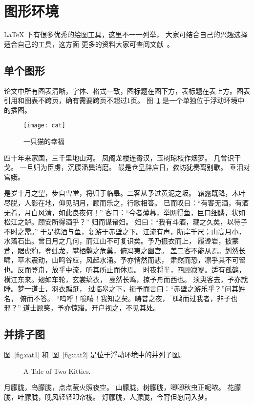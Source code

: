 \section{图形环境}

\LaTeX{} 下有很多优秀的绘图工具，这里不一一列举，
大家可结合自己的兴趣选择适合自己的工具，这方面
更多的资料大家可查阅文献~。

\subsection{单个图形}
论文中所有图表清晰，字体、格式一致，图标题在图下方，表标题在表上方。图表引用和图表不跨页，确有需要跨页不超过1页。
图~\ref{fig:cat} 是一个单独位于浮动环境中的插图。
\begin{figure}[!htbp]
\centering
\texttt{[image: cat]}
\caption{一只猫的幸福}\label{fig:cat}
\end{figure}

四十年来家国，三千里地山河。 凤阁龙楼连霄汉，玉树琼枝作烟萝。
几曾识干戈。 一旦归为臣虏，沉腰潘鬓消磨。
最是仓皇辞庙日，教坊犹奏离别歌。 垂泪对宫娥。

是岁十月之望，步自雪堂，将归于临皋。二客从予过黄泥之坂。
霜露既降，木叶尽脱，人影在地，仰见明月，顾而乐之，行歌相答。
已而叹曰：“有客无酒，有酒无肴，月白风清，如此良夜何！”
客曰：“今者薄暮，举网得鱼，巨口细鳞，状如松江之鲈。顾安所得酒乎？”
归而谋诸妇。 妇曰：“我有斗酒，藏之久矣，以待子不时之需。”
于是携酒与鱼，复游于赤壁之下。江流有声，断岸千尺；山高月小，
水落石出。曾日月之几何，而江山不可复识矣。予乃摄衣而上，
履谗岩，披蒙茸，踞虎豹，登虬龙，攀栖鹘之危巢，俯冯夷之幽宫。
盖二客不能从焉。划然长啸，草木震动，山鸣谷应，风起水涌。予亦悄然而悲，
肃然而恐，凛乎其不可留也。反而登舟，放乎中流，听其所止而休焉。
时夜将半，四顾寂寥。适有孤鹤，横江东来。翅如车轮，玄裳缟衣，
戛然长鸣，掠予舟而西也。 须臾客去，予亦就睡。梦一道士，羽衣蹁跹，
过临皋之下，揖予而言曰：“赤壁之游乐乎？”问其姓名， 俯而不答。
“呜呼！噫嘻！我知之矣。畴昔之夜，飞鸣而过我者，非子也邪？”
道士顾笑，予亦惊寤。开户视之，不见其处。


\subsection{并排子图}

图~\ref{fig:cat1} 和~图~\ref{fig:cat2} 是位于浮动环境中的并列子图。
\begin{figure}[!htbp]%
\centering
{}%
\qquad
{}%
\caption{A Tale of Two Kitties.}%
\end{figure}

月朦胧，鸟朦胧，点点萤火照夜空。 山朦胧，树朦胧，唧唧秋虫正呢哝。
花朦胧，叶朦胧，晚风轻轻叩帘栊。 灯朦胧，人朦胧，今宵但愿同入梦。

